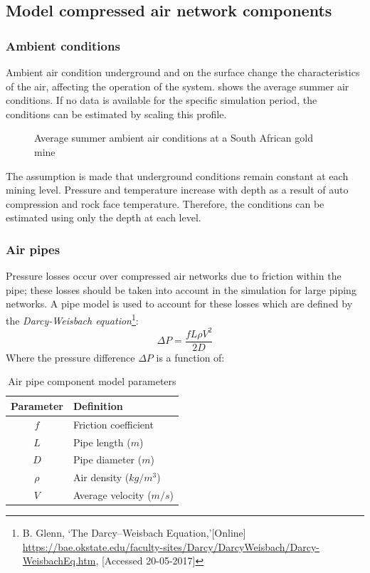 	\subsection{Model compressed air network components}
		\subsubsection{Ambient conditions}
		Ambient air condition underground and on the surface change the characteristics of the air, affecting the operation of the system.  shows the average summer air conditions. If no data is available for the specific simulation period, the conditions can be estimated by scaling this profile.
		\begin{figure}[h!]
			\centering
			\fbox{}
			\caption{Average summer ambient air conditions at a South African gold mine}
			\label{fig: Ambient}
		\end{figure}
		\par
		The assumption is made that underground conditions remain constant at each mining level. Pressure and temperature increase with depth as a result of auto compression and rock face temperature. Therefore, the conditions can be estimated using only the depth at each level.
		\subsubsection{Air pipes}
		Pressure losses occur over compressed air networks due to friction within the pipe; these losses should be taken into account in the simulation for large piping networks. A pipe model is used to account for these losses which are defined by the \textit{Darcy-Weisbach equation}\footnote{ B. Glenn, \enquote*{The Darcy–Weisbach Equation,}[Online] \url{https://bae.okstate.edu/faculty-sites/Darcy/DarcyWeisbach/Darcy-WeisbachEq.htm}, [Accessed 20-05-2017]}:
		$$\Delta P = \frac{f L \rho V^2}{2 D}$$
		Where the pressure difference $\Delta P $ is a function of:
		\begin{table}[h!]
			\centering
			\begin{tabular}{cl}
				\hline
				Parameter & Definition\\
				\hline
				$f$ & Friction coefficient \\
				$L$ & Pipe length ($m$) \\
				$D$ & Pipe diameter ($m$) \\
				$\rho$ & Air density ($kg/m^3$)\\	
				$V$ & Average velocity ($m/s$) \\	
				\hline
			\end{tabular} 
			\caption{Air pipe component model parameters}
			\label{table: Darcy-Weisbach}
		\end{table}
		

